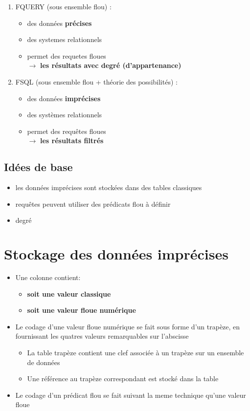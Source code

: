 \documentclass[a4paper,11pt]{article}
\begin{document}
\begin{enumerate}
\item FQUERY (sous ensemble flou) : \\
	\begin{itemize}
	\item des données \textbf{précises}
	\item des systemes relationnels
	\item permet des requetes floues\\
	$\longrightarrow$ \textbf{les résultats avec degré (d'appartenance)}
\end{itemize}

\item FSQL (sous ensemble flou + théorie des possibilités) : \\
	\begin{itemize}
	\item des données \textbf{imprécises}
	\item des systèmes relationnels
	\item permet des requêtes floues\\
	$\longrightarrow$ \textbf{les résultats filtrés}
\end{itemize}

\end{enumerate}

\subsection{Idées de base}
\begin{itemize}
	\item les données imprécises sont stockées dans des tables classiques
	\item requêtes peuvent utiliser des prédicats flou à définir
	\item degré
\end{itemize}


\section{Stockage des données imprécises}
\begin{itemize}
\item Une colonne contient:
\begin{itemize}
\item \textbf{soit une valeur classique}
\item \textbf{soit une valeur floue numérique}
\end{itemize}
\item Le codage d'une valeur floue numérique se fait sous forme d'un trapèze, en fournissant les quatres valeurs remarquables sur l'abscisse
\begin{itemize}
\item La table trapèze contient une clef associée à un trapèze sur un ensemble de données
\item Une référence au trapèze correspondant est stocké dans la table
\end{itemize}
\item Le codage d'un prédicat flou se fait suivant la meme technique qu'une valeur floue
\end{itemize}
\end{document}

